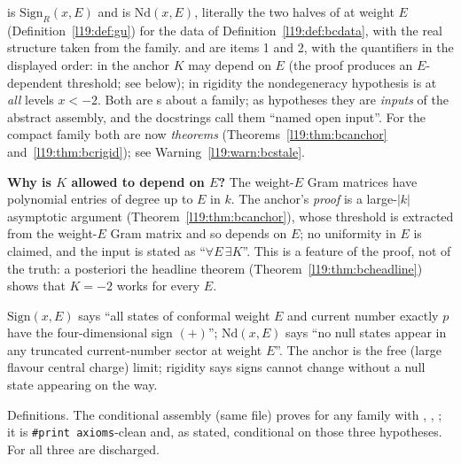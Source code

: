 \begin{dictionary}
 is $\mathrm{Sign}_R(x,E)$ and  is $\mathrm{Nd}(x,E)$, literally the
two halves of  at weight $E$ (Definition~\ref{l19:def:gu}) for the data of
Definition~\ref{l19:def:bcdata}, with the real structure taken from the family.  and
 are items 1 and 2, with the quantifiers in the displayed order: in the anchor $K$ may
depend on $E$ (the proof produces an $E$-dependent threshold; see below); in rigidity the nondegeneracy hypothesis is at \emph{all} levels $x<-2$. Both
are s about a family; as hypotheses they are \emph{inputs} of the abstract assembly, and the docstrings
call them ``named open input''. For the compact family both are now \emph{theorems}
(Theorems~\ref{l19:thm:bcanchor} and~\ref{l19:thm:bcrigid}); see Warning~\ref{l19:warn:bcstale}.

\textbf{Why is $K$ allowed to depend on $E$?} The weight-$E$ Gram matrices have polynomial entries of degree up to
$E$ in $k$. The anchor's \emph{proof} is a large-$|k|$ asymptotic argument (Theorem~\ref{l19:thm:bcanchor}), whose
threshold is extracted from the weight-$E$ Gram matrix and so depends on $E$; no uniformity in $E$ is claimed, and the
input is stated as ``$\forall E\,\exists K$''. This is a feature of the proof, not of the truth:
a posteriori the headline theorem (Theorem~\ref{l19:thm:bcheadline}) shows that $K=-2$ works for every $E$.
\end{dictionary}

\begin{physics}
$\mathrm{Sign}(x,E)$ says ``all states of conformal weight $E$ and current number exactly $p$ have the four-dimensional
sign $(+)$''; $\mathrm{Nd}(x,E)$ says ``no null states appear in any truncated current-number sector at weight $E$''.
The anchor is the free (large flavour central charge) limit; rigidity says signs cannot change without a null state
appearing on the way.
\end{physics}

\begin{status}
Definitions. The conditional assembly  (same file) proves
 for any family  with ,
, ; it is \texttt{\#print axioms}-clean and,
as stated, conditional on those three hypotheses. For  all three are discharged.
\end{status}

